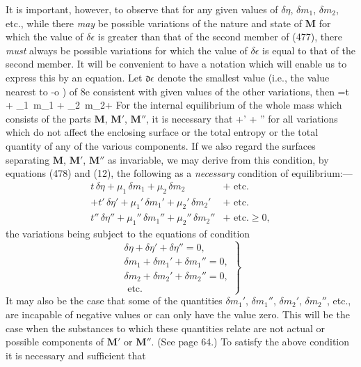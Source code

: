 \documentclass[12pt]{article}
\newcommand{\dd}{\delta}
\newcommand{\ddd}{\mathfrak{d}}
\begin{document}
{It is important, however, to observe that for any given values of $\delta \eta$, $\delta m_1$, $\delta m_2$, etc., while there \textit{may} be possible variations of the nature and state of $\mathbf{M}$ for which the value of $\delta \epsilon$ is greater than that of the second member of (477), there \textit{must} always be possible variations for which the value of $\delta \epsilon$ is equal to that of the second member. It will be convenient to have a notation which will enable us to express this by an equation. Let $\ddd \epsilon$ denote the smallest value (i.e., the value nearest to -o ) of 8e consistent with given values of the other variations, then
\eqs \dd \epsilon =t \,\dd \eta+ \mu_1 \,\dd m_1 + \mu_2 \,\dd m_2+ \label{478} \eqe
For the internal equilibrium of the whole mass which consists of
the parts $\mathbf{M}$, $\mathbf{M}'$, $\mathbf{M}''$, it is necessary that
\eqs \dd \epsilon +\dd \epsilon' +  \dd \epsilon'' \label{479} \eqe
for all variations which do not affect the enclosing surface or the total entropy or the total quantity of any of the various components. If we also regard the surfaces separating $\mathbf{M}$, $\mathbf{M}'$, $\mathbf{M}''$ as invariable, we may derive from this condition, by equations (478) and (12), the following as a \textit{necessary} condition of equilibrium:---
\begin{align}
t \, \dd \eta +\mu_1 \,\dd m_1 + \mu_2 \,\dd m_2 &+ \text{ etc.} \nonumber \\
+ t' \, \dd \eta' +\mu_1' \,\dd m_1' + \mu_2' \,\dd m_2' &+ \text{ etc.} \nonumber \\
 t'' \, \dd \eta'' +\mu_1'' \,\dd m_1'' + \mu_2'' \,\dd m_2'' &+ \text{ etc.}  \geq 0,  \label{480} \end{align}
the variations being subject to the equations of condition
\begin{equation}\left.\begin{array}{r}
\dd \eta + \dd\eta' +\dd\eta'' = 0, \\
\dd m_1 + \dd m_1' +\dd m_1'' = 0,   \\          
\dd m_2 + \dd m_2' +\dd m_2'' = 0, \\
\text{ etc.} \end{array} \label{481} \right\} \end{equation}
It may also be the case that some of the quantities $\dd m_1'$, $\dd m_1''$, $\dd m_2'$, $\dd m_2''$, etc., are incapable of negative values or can only have the value zero. This will be the case when the substances to which these quantities relate are not actual or possible components of $\mathbf{M}'$ or $\mathbf{M}''$. (See page 64.) To satisfy the above condition it is necessary and sufficient that
}
\end{document}
